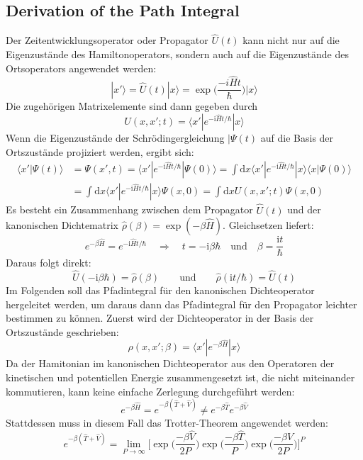 \documentclass[9pt]{report}
\begin{document}
\subsection{Derivation of the Path Integral}
Der Zeitentwicklungsoperator oder Propagator $\hat{U}(t)$ kann nicht nur auf die Eigenzustände des Hamiltonoperators, sondern auch auf die Eigenzustände des Ortsoperators angewendet werden:
\begin{equation}
|x'\rangle = \hat{U}(t)|x\rangle =\exp\Big(\frac{-i\hat{H}t}{\hbar}\Big)|x\rangle
\end{equation}
Die zugehörigen Matrixelemente sind dann gegeben durch
\begin{equation}
U(x,x';t)=\langle x'|e^{-\mathrm{i}\hat{H}t/\hbar}|x\rangle
\end{equation}
Wenn die Eigenzustände der Schrödingergleichung $|\Psi(t)$ auf die Basis der Ortszustände projiziert werden, ergibt sich:
\begin{align}
\langle x'|\Psi(t)\rangle &= \Psi(x',t) = \langle x'|e^{-\mathrm{i}\hat{H}t/\hbar}|\Psi(0)\rangle = \int\mathrm{d}x\langle x'|e^{-\mathrm{i}\hat{H}t/\hbar}|x\rangle\langle x|\Psi(0)\rangle\\
&= \int\mathrm{d}x\langle x'|e^{-\mathrm{i}\hat{H}t/\hbar}|x\rangle\Psi(x,0) = \int\mathrm{d}x U(x,x';t)\Psi(x,0)
\end{align}
Es besteht ein Zusammenhang zwischen dem Propagator $\hat{U}(t)$ und der kanonischen Dichtematrix $\hat{\rho}(\beta)=\exp(-\beta\hat{H})$. Gleichsetzen liefert:
\begin{equation}
e^{-\beta\hat{H}}=e^{-\mathrm{i}\hat{H}t/\hbar}\quad\Rightarrow\quad t=-\mathrm{i}\beta\hbar\quad\mathrm{und}\quad\beta=\frac{\mathrm{i}t}{\hbar}
\end{equation}
Daraus folgt direkt:
\begin{equation}
\hat{U}(-\mathrm{i}\beta\hbar) = \hat{\rho}(\beta)\qquad\mathrm{und}\qquad\hat{\rho}(\mathrm{i}t/\hbar) = \hat{U}(t)
\end{equation}
Im Folgenden soll das Pfadintegral für den kanonischen Dichteoperator hergeleitet werden, um daraus dann das Pfadintegral für den Propagator leichter bestimmen zu können. Zuerst wird der Dichteoperator in der Basis der Ortszustände geschrieben:
\begin{equation}
\rho(x,x';\beta) = \langle x'|e^{-\beta\hat{H}}|x\rangle
\end{equation}
Da der Hamitonian im kanonischen Dichteoperator aus den Operatoren der kinetischen und potentiellen Energie zusammengesetzt ist, die nicht miteinander kommutieren, kann keine einfache Zerlegung durchgeführt werden:
\begin{equation}
e^{-\beta\hat{H}}=e^{-\beta(\hat{T}+\hat{V})}\neq e^{-\beta\hat{T}}e^{-\beta\hat{V}}
\end{equation}
Stattdessen muss in diesem Fall das Trotter-Theorem angewendet werden:
\begin{equation}
e^{-\beta(\hat{T}+\hat{V})}=\lim_{P\to\infty}\bigg[\exp\Big(\frac{-\beta\hat{V}}{2P}\Big)\exp\Big(\frac{-\beta\hat{T}}{P}\Big)\exp\Big(\frac{-\beta\hat{V}}{2P}\Big)\bigg]^P
\end{equation}
\end{document}
